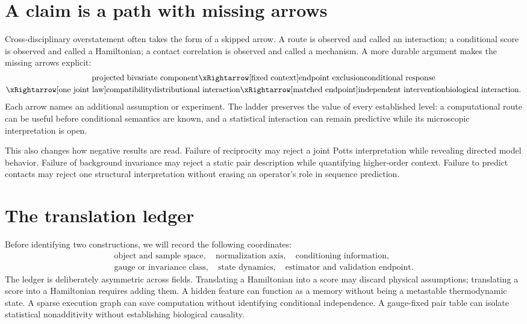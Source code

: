 \section{A claim is a path with missing arrows}

Cross-disciplinary overstatement often takes the form of a skipped arrow.  A route is observed and
called an interaction; a conditional score is observed and called a Hamiltonian; a contact
correlation is observed and called a mechanism.  A more durable argument makes the missing arrows
explicit:
\begin{equation}
\begin{gathered}
\text{projected bivariate component}
\xRightarrow[\text{fixed context}]{\text{endpoint exclusion}}
\text{conditional response}\\
\xRightarrow[\text{one joint law}]{\text{compatibility}}
\text{distributional interaction}
\xRightarrow[\text{matched endpoint}]{\text{independent intervention}}
\text{biological interaction}.
\end{gathered}
\label{eq:book-claim-ladder-detailed}
\end{equation}
Each arrow names an additional assumption or experiment.  The ladder preserves the value of every
established level: a computational route can be useful before conditional semantics are known, and
a statistical interaction can remain predictive while its microscopic interpretation is open.

This also changes how negative results are read.  Failure of reciprocity may reject a joint Potts
interpretation while revealing directed model behavior.  Failure of background invariance may
reject a static pair description while quantifying higher-order context.  Failure to predict
contacts may reject one structural interpretation without erasing an operator's role in sequence
prediction.

\section{The translation ledger}

Before identifying two constructions, we will record the following coordinates:
\begin{equation}
\boxed{
\begin{gathered}
\text{object and sample space},\quad
\text{normalization axis},\quad
\text{conditioning information},\\
\text{gauge or invariance class},\quad
\text{state dynamics},\quad
\text{estimator and validation endpoint}.
\end{gathered}}
\label{eq:book-translation-ledger}
\end{equation}
The ledger is deliberately asymmetric across fields.  Translating a Hamiltonian into a score may
discard physical assumptions; translating a score into a Hamiltonian requires adding them.  A
hidden feature can function as a memory without being a metastable thermodynamic state.  A sparse
execution graph can save computation without identifying conditional independence.  A gauge-fixed
pair table can isolate statistical nonadditivity without establishing biological causality.

